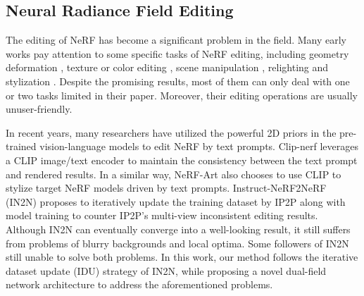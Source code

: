 
\subsection{Neural Radiance Field Editing}

The editing of NeRF \cite{mildenhall2021nerf} has become a significant problem in the field. Many early works pay attention to some specific tasks of NeRF editing, including geometry deformation \cite{yuan2022nerf, garbin2022voltemorph, xu2022deforming, tertikas2023partnerf, peng2022cagenerf, jambon2023nerfshop}, texture or color editing \cite{liu2021editing, xiang2021neutex, gong2023recolornerf, kuang2023palettenerf, lee2023ice}, scene manipulation \cite{niemeyer2021giraffe, xu2023discoscene}, relighting \cite{li2022climatenerf, zhang2021nerfactor, boss2021neural, srinivasan2021nerv} and stylization \cite{zhang2022arf, wang2023nerf}. Despite the promising results, most of them can only deal with one or two tasks limited in their paper. Moreover, their editing operations are usually unuser-friendly.

In recent years, many researchers have utilized the powerful 2D priors in the pre-trained vision-language models \cite{radford2021learning, nichol2021glide, rombach2022high} to edit NeRF by text prompts. Clip-nerf \cite{wang2022clip} leverages a CLIP \cite{radford2021learning} image/text encoder to maintain the consistency between the text prompt and rendered results. In a similar way, NeRF-Art \cite{wang2023nerf} also chooses to use CLIP to stylize target NeRF models driven by text prompts. Instruct-NeRF2NeRF (IN2N) \cite{haque2023instruct} proposes to iteratively update the training dataset by IP2P \cite{brooks2023instructpix2pix} along with model training to counter IP2P's multi-view inconsistent editing results. Although IN2N can eventually converge into a well-looking result, it still suffers from problems of blurry backgrounds and local optima. Some followers of IN2N \cite{fang2023text, mirzaei2023watch} still unable to solve both problems. In this work, our method follows the iterative dataset update (IDU) strategy of IN2N, while proposing a novel dual-field network architecture to address the aforementioned problems.
